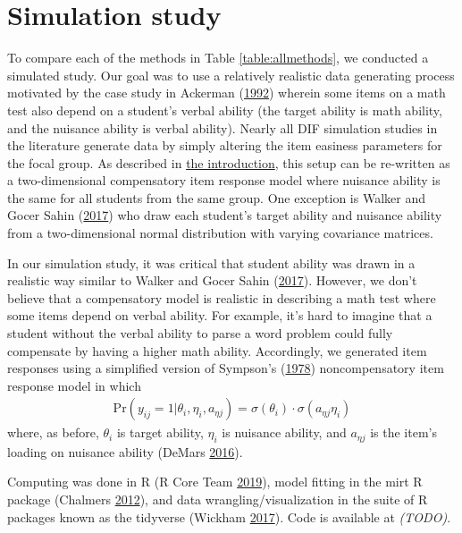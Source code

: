\documentclass[
  11pt,
]{article}
\begin{document}
\hypertarget{simstudy}{%
\section{Simulation study}\label{simstudy}}

To compare each of the methods in Table \ref{table:allmethods}, we conducted a simulated study. Our goal was to use a relatively realistic data generating process motivated by the case study in Ackerman (\protect\hyperlink{ref-ackerman1992didactic}{1992}) wherein some items on a math test also depend on a student's verbal ability (the target ability is math ability, and the nuisance ability is verbal ability). Nearly all DIF simulation studies in the literature generate data by simply altering the item easiness parameters for the focal group. As described in \protect\hyperlink{intro}{the introduction}, this setup can be re-written as a two-dimensional compensatory item response model where nuisance ability is the same for all students from the same group. One exception is Walker and Gocer Sahin (\protect\hyperlink{ref-walker2017using}{2017}) who draw each student's target ability and nuisance ability from a two-dimensional normal distribution with varying covariance matrices.

In our simulation study, it was critical that student ability was drawn in a realistic way similar to Walker and Gocer Sahin (\protect\hyperlink{ref-walker2017using}{2017}). However, we don't believe that a compensatory model is realistic in describing a math test where some items depend on verbal ability. For example, it's hard to imagine that a student without the verbal ability to parse a word problem could fully compensate by having a higher math ability. Accordingly, we generated item responses using a simplified version of Sympson's (\protect\hyperlink{ref-sympson1978model}{1978}) noncompensatory item response model in which
\begin{align}
\text{Pr}(y_{ij} = 1 | \theta_i, \eta_i, a_{\eta j}) = \sigma(\theta_i) \cdot \sigma(a_{\eta j}\eta_i)
\end{align}
where, as before, \(\theta_i\) is target ability, \(\eta_i\) is nuisance ability, and \(a_{\eta j}\) is the item's loading on nuisance ability (DeMars \protect\hyperlink{ref-demars2016partially}{2016}).

Computing was done in R (R Core Team \protect\hyperlink{ref-rcore}{2019}), model fitting in the mirt R package (Chalmers \protect\hyperlink{ref-chalmers2012mirt}{2012}), and data wrangling/visualization in the suite of R packages known as the tidyverse (Wickham \protect\hyperlink{ref-tidy}{2017}). Code is available at \emph{(TODO)}.
\end{document}
